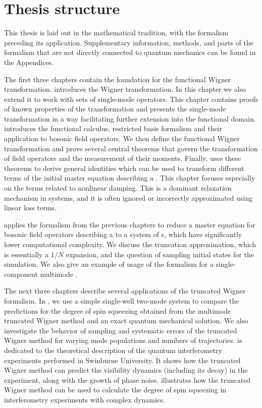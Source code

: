 \section{Thesis structure}

This thesis is laid out in the mathematical tradition, with the formalism preceding its application.
Supplementary information, methods, and parts of the formalism that are not directly connected to quantum mechanics can be found in the Appendices.

The first three chapters contain the foundation for the functional Wigner transformation.
 introduces the Wigner transformation.
In this chapter we also extend it to work with sets of single-mode operators.
This chapter contains proofs of known properties of the transformation and presents the single-mode transformation in a way facilitating further extension into the functional domain.
 introduces the functional calculus, restricted basis formalism and their application to bosonic field operators.
We then define the functional Wigner transformation and prove several central theorems that govern the transformation of field operators and the measurement of their moments.
Finally,  uses these theorems to derive general identities which can be used to transform different terms of the initial master equation describing a .
This chapter focuses especially on the terms related to nonlinear damping.
This is a dominant relaxation mechanism in  systems, and it is often ignored or incorrectly approximated using linear loss terms.

 applies the formalism from the previous chapters to reduce a master equation for bosonic field operators describing a  to a system of s, which have significantly lower computational complexity.
We discuss the truncation approximation, which is essentially a $1/N$ expansion, and the question of sampling initial states for the simulation.
We also give an example of usage of the formalism for a single-component multimode .

The next three chapters describe several applications of the truncated Wigner formalism.
In , we use a simple single-well two-mode system to compare the predictions for the degree of spin squeezing obtained from the multimode truncated Wigner method and an exact quantum mechanical solution.
We also investigate the behavior of sampling and systematic errors of the truncated Wigner method for varying mode populations and numbers of trajectories.
 is dedicated to the theoretical description of the quantum interferometry experiments performed in Swinburne University.
It shows how the truncated Wigner method can predict the visibility dynamics (including its decay) in the experiment, along with the growth of phase noise.
 illustrates how the truncated Wigner method can be used to calculate the degree of spin squeezing in interferometry experiments with complex dynamics.

